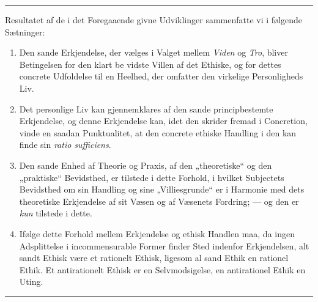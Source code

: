 \begin{center}\rule{2cm}{0.4pt}\end{center}

Resultatet af de i det Foregaaende givne Udviklinger sammenfatte vi i følgende
Sætninger:

\begin{enumerate}[label=\arabic*., leftmargin=*, labelsep=1em,
                  topsep=0.35\baselineskip, itemsep=0.35\baselineskip]
\item Den sande Erkjendelse, der vælges i Valget mellem \emph{Viden} og
  \emph{Tro}, bliver Betingelsen for den klart be%
vidste Villen af det Ethiske, og for dettes concrete Udfoldelse til en Heelhed,
  der omfatter den virkelige Personligheds Liv.
\item Det personlige Liv kan gjennemklares af den sande principbestemte
  Erkjendelse, og denne Erkjendelse kan, idet den skrider fremad i Concretion,
  vinde en saadan Punktualitet, at den concrete ethiske Handling i den kan finde
  sin \textit{ratio sufficiens}.
\item Den sande Enhed af Theorie og Praxis, af den „theoretiske“ og den
  „praktiske“ Bevidsthed, er tilstede i dette Forhold, i hvilket Subjectets
  Bevidsthed om sin Handling og sine „Villiesgrunde“ er i Harmonie med dets
  theoretiske Erkjendelse af sit Væsen og af Væsenets Fordring; --- og den er
  \emph{kun} tilstede i dette.
\item Ifølge dette Forhold mellem Erkjendelse og ethisk Handlen maa, da ingen
  Adsplittelse i incommensurable Former finder Sted indenfor Erkjendelsen, alt
  sandt Ethisk være et rationelt Ethisk, ligesom al sand Ethik en rationel
  Ethik. Et antirationelt Ethisk er en Selvmodsigelse, en antirationel Ethik en
  Uting.
\end{enumerate}

\begin{center}\rule{2cm}{0.4pt}\end{center}

